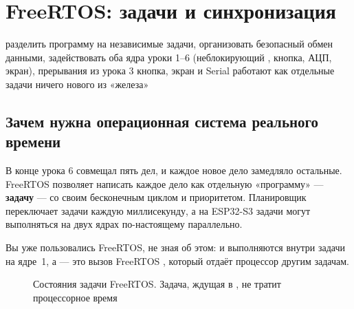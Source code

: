 \section{FreeRTOS: задачи и синхронизация}\label{les:rtos}
\lessonintro
  {разделить программу на независимые задачи, организовать безопасный обмен данными, задействовать оба ядра}
  {уроки 1--6 (неблокирующий , кнопка, АЦП, экран), прерывания из урока 3}
  {кнопка, экран и Serial работают как отдельные задачи}
  {ничего нового из «железа»}

\subsection{Зачем нужна операционная система реального времени}

В конце урока 6  совмещал пять дел, и каждое новое дело замедляло остальные.
FreeRTOS позволяет написать каждое дело как отдельную «программу» --- \textbf{задачу} --- со своим
бесконечным циклом и приоритетом. Планировщик переключает задачи каждую миллисекунду, а на
ESP32-S3 задачи могут выполняться на двух ядрах по-настоящему параллельно.

Вы уже пользовались FreeRTOS, не зная об этом:  и  выполняются внутри
задачи  на ядре~1, а  --- это вызов FreeRTOS , который
отдаёт процессор другим задачам.

\begin{figure}[H]
\centering
{}
\caption{Состояния задачи FreeRTOS. Задача, ждущая в , не тратит процессорное время}
\end{figure}

